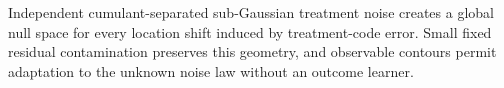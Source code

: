 Independent cumulant-separated sub-Gaussian treatment noise creates a global null space for every location shift induced by treatment-code error. Small fixed residual contamination preserves this geometry, and observable contours permit adaptation to the unknown noise law without an outcome learner.